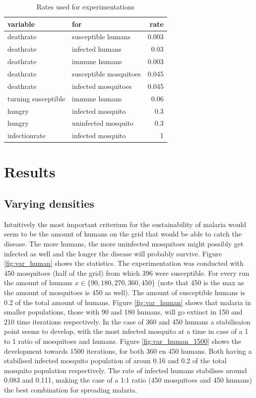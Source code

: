 \documentclass[a4paper]{report}
\begin{document}
\begin{table}
\centering
\begin{tabular}{|l|l|r|}
        \hline
        variable&for&rate\\
        \hline
        deathrate&susceptible humans &0.003\\
        deathrate&infected humans&0.03\\
        deathrate&immune humans&0.003\\
        deathrate&susceptible mosquitoes&0.045\\
        deathrate&infected mosquitoes&0.045\\
        turning susceptible&immune humans& 0.06\\
        hungry&infected mosquito  & 0.3\\
        hungry&uninfected mosquito& 0.3\\
        infectionrate&infected mosquito& 1\\
        \hline
\end{tabular}
\caption{Rates used for experimentations }
\label{tab:rates}
\end{table}

\section{Results}

\subsection{Varying densities} 
Intuitively the most important criterium for the sustainability of malaria would
seem to be the amount of humans on the grid that would be able to catch the
disease. The more humans, the more uninfected mosquitoes might possibly get
infected as well and the longer the disease will probably survive. Figure
\ref{fig:var_human} shows the statistics. The
experimentation was conducted  with 450 mosquitoes (half of the grid) from which
396 were susceptible.  For every run the amount of humans $x \in \{90, 180,
270, 360, 450\}$ (note that 450 is the max as the amount of mosquitoes is 450 as
well). The amount of susceptible humans is 0.2 of the total amount of humans.
Figure \ref{fig:var_human} shows that malaria in smaller populations, those
with 90 and 180 humans, will go extinct in 150 and 210 time iterations
respectively. In the case of 360 and 450 humans a stabilisaion point seems to
develop, with the most infected mosquito at a time in case of a 1 to 1 ratio of
mosquitoes and humans. Figure \ref{fig:var_human_1500} shows the development towards 1500
iterations, for both 360 en 450 humans. Both having a stabilised infected
mosquito population of aroun 0.16 and 0.2 of the total mosquito population
respectively. The rate of infected humans stabilises around 0.083 and  0.111,
making the case of a 1:1 ratio (450 mosquitoes and 450 humans) the best
combination for spreading malaria.
\end{document}
